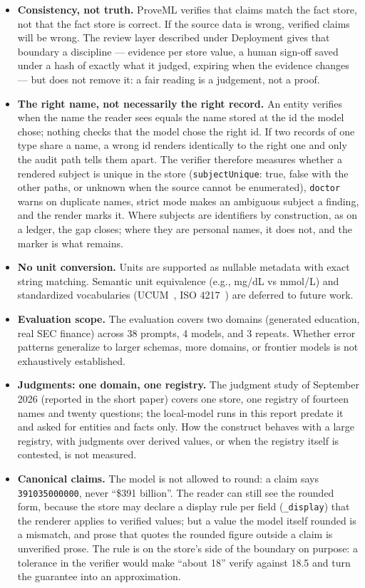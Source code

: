 \documentclass[11pt,a4paper]{article}
\begin{document}
\begin{itemize}[nosep]
    \item \textbf{Consistency, not truth.} ProveML verifies that claims match the fact store, not that the fact store is correct. If the source data is wrong, verified claims will be wrong. The review layer described under Deployment gives that boundary a discipline --- evidence per store value, a human sign-off saved under a hash of exactly what it judged, expiring when the evidence changes --- but does not remove it: a fair reading is a judgement, not a proof.
    \item \textbf{The right name, not necessarily the right record.} An entity verifies when the name the reader sees equals the name stored at the id the model chose; nothing checks that the model chose the right id. If two records of one type share a name, a wrong id renders identically to the right one and only the audit path tells them apart. The verifier therefore measures whether a rendered subject is unique in the store (\texttt{subjectUnique}: true, false with the other paths, or unknown when the source cannot be enumerated), \texttt{doctor} warns on duplicate names, strict mode makes an ambiguous subject a finding, and the render marks it. Where subjects are identifiers by construction, as on a ledger, the gap closes; where they are personal names, it does not, and the marker is what remains.
    \item \textbf{No unit conversion.} Units are supported as nullable metadata with exact string matching. Semantic unit equivalence (e.g., mg/dL vs mmol/L) and standardized vocabularies (UCUM~\citep{ucum}, ISO 4217~\citep{iso4217}) are deferred to future work.
    \item \textbf{Evaluation scope.} The evaluation covers two domains (generated education, real SEC finance) across 38 prompts, 4 models, and 3 repeats. Whether error patterns generalize to larger schemas, more domains, or frontier models is not exhaustively established.
    \item \textbf{Judgments: one domain, one registry.} The judgment study of September 2026 (reported in the short paper) covers one store, one registry of fourteen names and twenty questions; the local-model runs in this report predate it and asked for entities and facts only. How the construct behaves with a large registry, with judgments over derived values, or when the registry itself is contested, is not measured.
    \item \textbf{Canonical claims.} The model is not allowed to round: a claim says \texttt{391035000000}, never ``\$391 billion''. The reader can still see the rounded form, because the store may declare a display rule per field (\texttt{\_display}) that the renderer applies to verified values; but a value the model itself rounded is a mismatch, and prose that quotes the rounded figure outside a claim is unverified prose. The rule is on the store's side of the boundary on purpose: a tolerance in the verifier would make ``about 18'' verify against 18.5 and turn the guarantee into an approximation.

\end{itemize}
\end{document}
